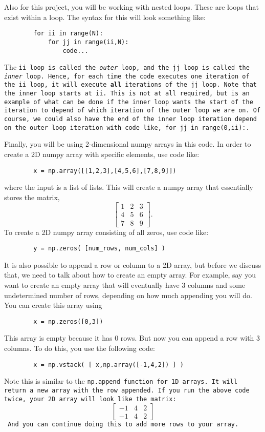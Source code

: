 \documentclass{article}
\begin{document}
	Also for this project, you will be working with nested loops.  These are loops that exist within a loop.  The syntax for this will look something like:
	\begin{verbatim}
		for ii in range(N):
		    for jj in range(ii,N):
		        code...
	\end{verbatim}
	The \tt{ii} loop is called the \emph{outer} loop, and the  \tt{jj} loop is called the \emph{inner} loop.  Hence, for each time the code executes one iteration of the \tt{ii} loop, it will execute \textbf{all} iterations of the \tt{jj} loop.  Note that the inner loop starts at \tt{ii}.  This is not at all required, but is an example of what can be done if the inner loop wants the start of the iteration to depend of which iteration of the outer loop we are on.  Of course, we could also have the end of the inner loop iteration depend on the outer loop iteration with code like, \tt{for jj in range(0,ii):}.
	
	Finally, you will be using 2-dimensional numpy arrays in this code.  In order to create a 2D numpy array with specific elements, use code like:
	\begin{verbatim}
		x = np.array([[1,2,3],[4,5,6],[7,8,9]])
	\end{verbatim}
	where the input is a list of lists.  This will create a numpy array that essentially stores the matrix,
	\[ \begin{bmatrix} 1&2&3 \\ 4& 5&6\\7&8&9 \end{bmatrix}. \]
	To create a 2D numpy array consisting of all zeros, use code like:
	\begin{verbatim}
		y = np.zeros( [num_rows, num_cols] )
	\end{verbatim}
	
	It is also possible to append a row or column to a 2D array, but before we discuss that, we need to talk about how to create an empty array.  For example, say you want to create an empty array that will eventually have 3 columns and some undetermined number of rows, depending on how much appending you will do.  You can create this array using 
	\begin{verbatim}
		x = np.zeros([0,3])
	\end{verbatim}
	This array is empty because it has 0 rows.  But now you can append a row with 3 columns.  To do this, you use the following code:
	\begin{verbatim}
		x = np.vstack( [ x,np.array([-1,4,2]) ] )
	\end{verbatim}
	Note this is similar to the \tt{np.append} function for 1D arrays.  It will return a new array with the row appended.  If you run the above code twice, your 2D array will look like the matrix:
	\[ \begin{bmatrix}
		 -1 & 4 & 2 \\
		 -1 & 4 & 2
	\end{bmatrix} \]
	And you can continue doing this to add more rows to your array.
	
\end{document}
